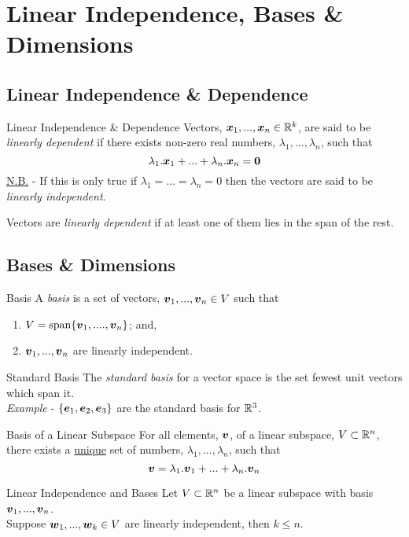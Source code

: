 \documentclass[11pt,a4paper]{article}
\begin{document}
\section{Linear Independence, Bases \& Dimensions}
\subsection{Linear Independence \& Dependence}
%
\subtitle{Definition 4.01 - }{Linear Independence \& Dependence}
Vectors, $\boldsymbol{x}_1, ... , \boldsymbol{x}_n \in \mathbb{R}^k$, are said to be \textit{linearly dependent} if there exists non-zero real numbers, $\lambda_1, ... , \lambda_n$, such that
$$\lambda_1.\boldsymbol{x}_1 + ... + \lambda_n.\boldsymbol{x}_n = \boldsymbol{0}$$
\underline{N.B.} - If this is only true if $\lambda_1 = ... = \lambda_n = 0$ then the vectors are said to be \textit{linearly independent}. \\

\subtitle{Remark 4.02}{}
Vectors are \textit{linearly dependent} if at least one of them lies in the span of the rest.

\subsection{Bases \& Dimensions}
%
\subtitle{Definition 4.03 - }{Basis}
A \textit{basis} is a set of vectors, $\boldsymbol{v}_1, ... , \boldsymbol{v}_n \in V$ such that
\begin{enumerate}[label=\roman*)]
  \item $V = \mathrm{span}\{\boldsymbol{v}_1, .... , \boldsymbol{v}_n\}$; and,
  \item $\boldsymbol{v}_1, ... , \boldsymbol{v}_n$ are linearly independent.\\
\end{enumerate}

\subtitle{Definition 4.04 - }{Standard Basis}
The \textit{standard basis} for a vector space is the set fewest unit vectors which span it. \\
\textit{Example} - $\{\boldsymbol{e}_1, \boldsymbol{e}_2 , \boldsymbol{e}_3\}$ are the standard basis for $\mathbb{R}^3$. \\

\subtitle{Theorem 4.05 - }{Basis of a Linear Subspace}
For all elements, $\boldsymbol{v}$, of a linear subspace, $V \subset \mathbb{R}^n$, there exists a \underline{unique} set of numbers, $\lambda_1, ... , \lambda_n$, such that
$$\boldsymbol{v} = \lambda_1.\boldsymbol{v}_1 + ... + \lambda_n.\boldsymbol{v}_n$$

\subtitle{Theorem 4.06 - }{Linear Independence and Bases}
Let $V \subset \mathbb{R}^n$ be a linear subspace with basis ${\boldsymbol{v}_1, ... , \boldsymbol{v}_n}$.\\
Suppose $\boldsymbol{w}_1 , ... , \boldsymbol{w}_k \in V$ are linearly independent, then $k \leq n$.\\
\end{document}
